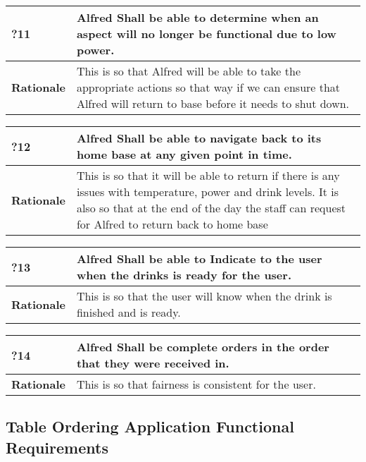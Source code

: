 \documentclass [11pt]{article}
\begin{document}
\begin{longtable}{| p{ } | p{ } | }\hline 
	\rowcolor{tableCell}\textbf{?11} & Alfred Shall be able to determine when an aspect will no longer be functional due to low power. \\ \hline
	\textbf{Rationale} &  This is so that Alfred will be able to take the appropriate actions so that way if we can ensure that Alfred will return to base before it needs to shut down.\\ \hline 
\end{longtable}

\begin{longtable}{| p{ } | p{ } | }\hline 
	\rowcolor{tableCell}\textbf{?12} & Alfred Shall be able to navigate back to its home base at any given point in time. \\ \hline
	\textbf{Rationale} &  This is so that it will be able to return if there is any issues with temperature, power and drink levels. It is also so that at the end of the day the staff can request for Alfred to return back to home base\\ \hline 
\end{longtable}

\begin{longtable}{| p{ } | p{ } | }\hline 
	\rowcolor{tableCell}\textbf{?13} & Alfred Shall be able to Indicate to the user when the drinks is ready for the user. \\ \hline
	\textbf{Rationale} &  This is so that the user will know when the drink is finished and is ready.\\ \hline 
\end{longtable}

\begin{longtable}{| p{ } | p{ } | }\hline 
	\rowcolor{tableCell}\textbf{?14} & Alfred Shall be complete orders in the order that they were received in. \\ \hline
	\textbf{Rationale} &  This is so that fairness is consistent for the user.\\ \hline 
\end{longtable}

\subsection{Table Ordering Application Functional Requirements}
\end{document}

